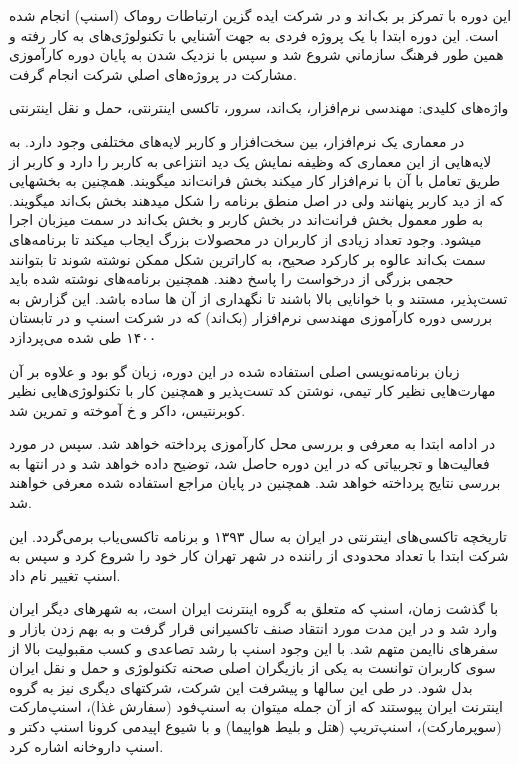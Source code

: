 \documentclass[a4]{report}
\begin{document}
این دوره با تمرکز بر بک‌اند و در شرکت ایده گزین ارتباطات روماک (اسنپ) انجام شده است.
این دوره ابتدا با یک پروژه فردی به جهت آشنایي با تکنولوژی‌های به کار رفته و همین طور فرهنگ
سازماني شروع شد و سپس با نزدیک شدن به پایان دوره کارآموزی مشارکت در پروژه‌های اصلي شرکت انجام گرفت.

واژه‌های کلیدی: مهندسی نرم‌افزار، بک‌اند، سرور، تاکسی اینترنتی، حمل و نقل اینترنتی

در معماری یک نرم‌افزار، بین سخت‌افزار و کاربر لایه‌های مختلفی وجود دارد. به لایه‌هایی از این معماری که
وظیفه نمایش یک دید انتزاعی به کاربر را دارد و کاربر از طریق تعامل با آن با نرم‌افزار کار میکند بخش فرانت‌اند
میگویند. همچنین به بخشهایی که از دید کاربر پنهانند ولی در اصل منطق برنامه را شکل میدهند بخش بک‌اند
میگویند. به طور معمول بخش فرانت‌اند در بخش کاربر و بخش بک‌اند در سمت میزبان اجرا میشود.
 وجود تعداد زیادی از کاربران در محصولات بزرگ ایجاب میکند تا برنامه‌های سمت بک‌اند عالوه بر کارکرد
صحیح، به کارا‌ترین شکل ممکن نوشته شوند تا بتوانند حجمی بزرگی از درخواست را پاسخ دهند. همچنین
برنامه‌های نوشته شده باید تست‌پذیر، مستند و با خوانایی بالا باشند تا نگهداری از آن ها ساده باشد.
این گزارش به بررسی دوره کارآموزی مهندسی نرم‌افزار (بک‌اند) که در شرکت اسنپ و در تابستان ۱۴۰۰ طی شده می‌پردازد

زبان برنامه‌نویسی اصلی استفاده شده در این دوره، زبان گو بود و علاوه بر آن مهارت‌هایی نظیر کار تیمی، نوشتن کد تست‌پذیر و همچنین کار با تکنولوژی‌هایی نظیر کوبرنتیس، داکر و ‌خ آموخته و تمرین شد.

در ادامه ابتدا به معرفی و بررسی محل کارآموزی پرداخته خواهد شد. سپس در مورد فعالیت‌ها و تجربیاتی که
در این دوره حاصل شد، توضیح داده خواهد شد و در انتها به بررسی نتایج پرداخته خواهد شد. همچنین در پایان
مراجع استفاده شده معرفی خواهند شد.

تاریخچه تاکسی‌های اینترنتی در ایران به سال ۱۳۹۳ و برنامه تاکسی‌یاب برمی‌گردد. این شرکت ابتدا با
تعداد محدودی از راننده در شهر تهران کار خود را شروع کرد و سپس به اسنپ تغییر نام داد.

با گذشت زمان، اسنپ که متعلق به گروه اینترنت ایران است، به شهرهای دیگر ایران وارد شد و در این مدت مورد انتقاد صنف تاکسیرانی
قرار گرفت و به بهم زدن بازار و سفرهای ناایمن متهم شد. با این وجود اسنپ با رشد تصاعدی و کسب مقبولیت
بالا از سوی کاربران توانست به یکی از بازیگران اصلی صحنه تکنولوژی و حمل و نقل ایران بدل شود. در طی این
سالها و پیشرفت این شرکت، شرکتهای دیگری نیز به گروه اینترنت ایران پیوستند که از آن جمله میتوان به
اسنپ‌فود (سفارش غذا)، اسنپ‌مارکت (سوپرمارکت)، اسنپ‌تریپ (هتل و بلیط هواپیما) و با شیوع اپیدمی کرونا اسنپ دکتر و اسنپ داروخانه اشاره کرد.
\end{document}
